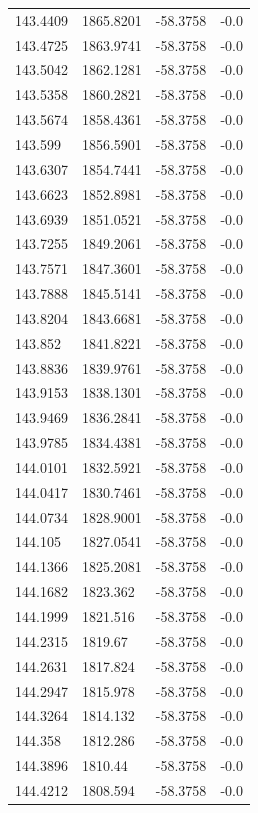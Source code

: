 \begin{table}[H]
\begin{tabular}{llll}
143.4409 & 1865.8201 & -58.3758 & -0.0 \\
143.4725 & 1863.9741 & -58.3758 & -0.0 \\
143.5042 & 1862.1281 & -58.3758 & -0.0 \\
143.5358 & 1860.2821 & -58.3758 & -0.0 \\
143.5674 & 1858.4361 & -58.3758 & -0.0 \\
143.599 & 1856.5901 & -58.3758 & -0.0 \\
143.6307 & 1854.7441 & -58.3758 & -0.0 \\
143.6623 & 1852.8981 & -58.3758 & -0.0 \\
143.6939 & 1851.0521 & -58.3758 & -0.0 \\
143.7255 & 1849.2061 & -58.3758 & -0.0 \\
143.7571 & 1847.3601 & -58.3758 & -0.0 \\
143.7888 & 1845.5141 & -58.3758 & -0.0 \\
143.8204 & 1843.6681 & -58.3758 & -0.0 \\
143.852 & 1841.8221 & -58.3758 & -0.0 \\
143.8836 & 1839.9761 & -58.3758 & -0.0 \\
143.9153 & 1838.1301 & -58.3758 & -0.0 \\
143.9469 & 1836.2841 & -58.3758 & -0.0 \\
143.9785 & 1834.4381 & -58.3758 & -0.0 \\
144.0101 & 1832.5921 & -58.3758 & -0.0 \\
144.0417 & 1830.7461 & -58.3758 & -0.0 \\
144.0734 & 1828.9001 & -58.3758 & -0.0 \\
144.105 & 1827.0541 & -58.3758 & -0.0 \\
144.1366 & 1825.2081 & -58.3758 & -0.0 \\
144.1682 & 1823.362 & -58.3758 & -0.0 \\
144.1999 & 1821.516 & -58.3758 & -0.0 \\
144.2315 & 1819.67 & -58.3758 & -0.0 \\
144.2631 & 1817.824 & -58.3758 & -0.0 \\
144.2947 & 1815.978 & -58.3758 & -0.0 \\
144.3264 & 1814.132 & -58.3758 & -0.0 \\
144.358 & 1812.286 & -58.3758 & -0.0 \\
144.3896 & 1810.44 & -58.3758 & -0.0 \\
144.4212 & 1808.594 & -58.3758 & -0.0 \\

\end{tabular}
\end{table}
